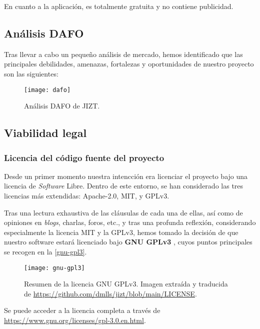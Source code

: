 En cuanto a la aplicación, es totalmente gratuita y no contiene publicidad.

\newpage
\subsection{Análisis DAFO}

Tras llevar a cabo un pequeño análisis de mercado, hemos identificado que las principales debilidades, amenazas, fortalezas y oportunidades de nuestro proyecto son las siguientes:

\begin{figure}[h]
	\centering
	\texttt{[image: dafo]}
	\vspace{-0.5cm}
	\caption{Análisis DAFO de JIZT.}
\end{figure}

\subsection{Viabilidad legal}

\subsubsection{Licencia del código fuente del proyecto}

Desde un primer momento nuestra intencción era licenciar el proyecto bajo una licencia de \emph{Software} Libre. Dentro de este entorno, se han considerado las tres licencias más extendidas: Apache-2.0, MIT, y GPLv3.

Tras una lectura exhaustiva de las cláusulas de cada una de ellas, así como de opiniones en \emph{blogs}, charlas, foros, etc., y tras una profunda reflexión, considerando especialmente la licencia MIT y la GPLv3, hemos tomado la decisión de que nuestro software estará licenciado bajo \textbf{GNU GPLv3} \cite{gplv3}, cuyos puntos principales se recogen en la \autoref{gnu-gpl3}.

\begin{figure}[h]
	\centering
	\texttt{[image: gnu-gpl3]}
	\vspace{-0.5cm}
	\caption[Resumen de la licencia GNU GPLv3]{Resumen de la licencia GNU GPLv3. Imagen extraída y traducida de \href{https://github.com/dmlls/jizt/blob/main/LICENSE}{https://github.com/dmlls/jizt/blob/main/LICENSE}.}
	\label{gnu-gpl3}
\end{figure}

Se puede acceder a la licencia completa a través de \href{https://www.gnu.org/licenses/gpl-3.0.en.html}{https://www.gnu.org/\newline licenses/gpl-3.0.en.html}.

